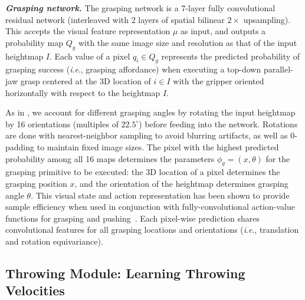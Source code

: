 \documentclass[journal]{IEEEtran}
\newcommand{\ie}{\textit{i}.\textit{e}., }
\newcommand{\mypara}[1]{\par\vspace*{0.8mm}\noindent\textbf{\textit{#1}}}
\begin{document}
\mypara{Grasping network.} The grasping network is a 7-layer fully convolutional residual network \cite{badrinarayanan2015segnet,he2016deep,long2015fully} (interleaved with 2 layers of spatial bilinear $2\times$ upsampling). This accepts the visual feature representation $\mu$ as input, and outputs a probability map $Q_g$ with the same image size and resolution as that of the input heightmap $I$. 
Each value of a pixel $q_i\in{Q_g}$ represents the predicted probability of grasping success (\ie grasping affordance) when executing a top-down parallel-jaw grasp centered at the 3D location of $i\in{I}$ with the gripper oriented horizontally with respect to the heightmap ${I}$.

As in \cite{zeng2018robotic,zeng2018learning,zeng2019thesis,zakka2020form2fit}, we account for different grasping angles by rotating the input heightmap by 16 orientations (multiples of $22.5^\circ$) before feeding into the network. Rotations are done with nearest-neighbor sampling to avoid blurring artifacts, as well as 0-padding to maintain fixed image sizes.
The pixel with the highest predicted probability among all 16 maps determines the parameters $\phi_{g}=(x,\theta)$ for the grasping primitive to be executed: the 3D location of a pixel determines the grasping position $x$, and the orientation of the heightmap determines grasping angle $\theta$. This visual state and action representation has been shown to provide sample efficiency when used in conjunction with fully-convolutional action-value functions for grasping and pushing~\cite{zeng2018learning,zeng2018robotic}. Each pixel-wise prediction shares convolutional features for all grasping locations and orientations (\ie translation and rotation equivariance). 





\subsection{Throwing Module: Learning Throwing Velocities}
\label{sec:throwing}
\end{document}
